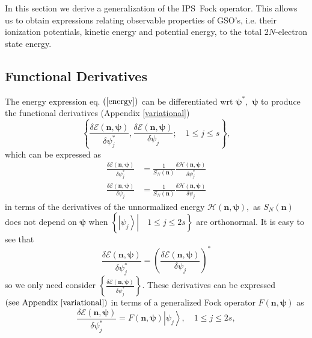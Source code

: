 \documentclass[titlepage]{article}%
\begin{document}
In this section we derive a generalization of the IPS\ Fock operator. This
allows us to obtain expressions relating observable properties of GSO's, i.e.
their ionization potentials, kinetic energy and potential energy, to the total
$2N$-electron state energy.

\subsection{Functional Derivatives\label{FD}}

The energy expression eq. $\left(  \ref{energy}\right)  $ can be
differentiated wrt $\bm{\psi}^{\ast},$ $\bm{\psi}$ to produce the functional
derivatives (Appendix \ref{variational})
\begin{equation}
\left\{  \frac{\delta\mathcal{E}\left(  \bm{n,\psi}\right)  }{\delta\psi
_{j}^{\ast}},\frac{\delta\mathcal{E}\left(  \bm{n,\psi}\right)  }{\delta
\psi_{j}};\quad1\leq j\leq s\right\}  ,
\end{equation}
which can be expressed as%
\begin{align}
\frac{\delta\mathcal{E}\left(  \bm{n,\psi}\right)  }{\delta\psi_{j}^{\ast}}
&  =\frac{1}{S_{N}\left(  \bm{n}\right)  }\frac{\delta\mathcal{H}\left(
\bm{n,\psi}\right)  }{\delta\psi_{j}^{\ast}}\\
\frac{\delta\mathcal{E}\left(  \bm{n,\psi}\right)  }{\delta\psi_{j}}  &
=\frac{1}{S_{N}\left(  \bm{n}\right)  }\frac{\delta\mathcal{H}\left(
\bm{n,\psi}\right)  }{\delta\psi_{j}}%
\end{align}
in terms of the derivatives of the unnormalized energy $\mathcal{H}\left(
\bm{n,\psi}\right)  ,$ as $S_{N}\left(  \bm{n}\right)  $ does not depend on
$\bm{\psi}$ when $\left\{  \left.  \left\vert \psi_{j}\right\rangle
\right\vert \quad1\leq j\leq2s\right\}  $ are orthonormal. It is easy to see
that
\begin{equation}
\frac{\delta\mathcal{E}\left(  \bm{n,\psi}\right)  }{\delta\psi_{j}^{\ast}%
}=\left(  \frac{\delta\mathcal{E}\left(  \bm{n,\psi}\right)  }{\delta\psi_{j}%
}\right)  ^{\ast}%
\end{equation}
so we only need consider $\left\{  \frac{\delta\mathcal{E}\left(
\bm{n,\psi}\right)  }{\delta\psi_{j}^{\ast}}\right\}  .$ These derivatives can
be expressed $\left(  \text{see Appendix \ref{variational}}\right)  $ in terms
of a generalized Fock operator $F\left(  \bm{n,\psi}\right)  $ as
\begin{equation}
\frac{\delta\mathcal{E}\left(  \bm{n,\psi}\right)  }{\delta\psi_{j}^{\ast}%
}=F\left(  \bm{n,\psi}\right)  \left\vert \psi_{j}\right\rangle ,\quad1\leq
j\leq2s, \label{H_deriv}%
\end{equation}
\end{document}
